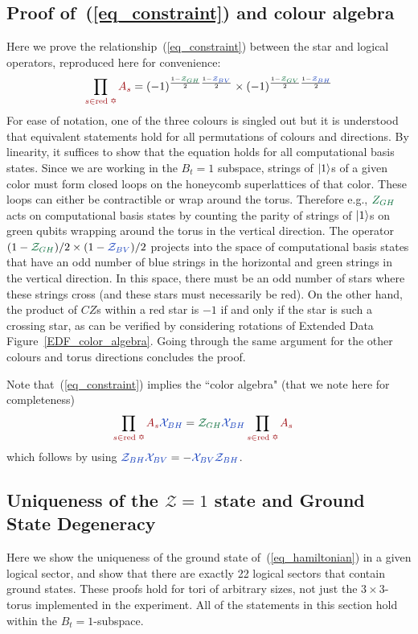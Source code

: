\documentclass[nofootinbib,pra,twocolumn,showpacs,superscriptaddress,notitlepage,amsmath]{revtex4-2} %
\begin{document}
\subsection{Proof of~(\ref{eq_constraint}) and colour algebra}
Here we prove the relationship~(\ref{eq_constraint}) between the star and logical operators, reproduced here for convenience:
\begin{equation}
    \prod_{\red{s \in \text{red \ding{65}}}} \red{A_s} = (-1)^{\frac{1-\green{\mathcal{Z}_{GH}}}{2}\frac{1-\blue{\mathcal{Z}_{BV}}}{2}} \times (-1)^{\frac{1-\green{\mathcal{Z}_{GV}}}{2}\frac{1-\blue{\mathcal{Z}_{BH}}}{2}}
\end{equation}
For ease of notation, one of the three colours is singled out but it is understood that equivalent statements hold for all permutations of colours and directions. By linearity, it suffices to show that the equation holds for all computational basis states. Since we are working in the $B_t = 1$ subspace, strings of $\ket{1}$s of a given color must form closed loops on the honeycomb superlattices of that color. These loops can either be contractible or wrap around the torus. Therefore e.g., $\green{Z_{GH}}$ acts on computational basis states by counting the parity of strings of $\ket{1}$s on green qubits wrapping around the torus in the vertical direction. The operator $(1-\green{\mathcal{Z}_{GH}})/2 \times (1-\blue{\mathcal{Z}_{BV}})/2$ projects into the space of computational basis states that have an odd number of blue strings in the horizontal and green strings in the vertical direction. In this space, there must be an odd number of stars where these strings cross (and these stars must necessarily be red). On the other hand, the product of $CZ$s within a red star is $-1$ if and only if the star is such a crossing star, as can be verified by considering rotations of Extended Data Figure~\ref{EDF_color_algebra}. Going through the same argument for the other colours and torus directions concludes the proof.

Note that~(\ref{eq_constraint}) implies the ``color algebra" (that we note here for completeness)
\begin{align}
    \prod_{\red{s \in \text{red \ding{65}}}} \red{A_s} \blue{\mathcal{X}_{BH}} &= \green{\mathcal{Z}_{GH}} \blue{\mathcal{X}_{BH}} \prod_{\red{s \in \text{red \ding{65}}}} \red{A_s}
\end{align}
which follows by using $\blue{\mathcal{Z}_{BH} \mathcal{X}_{BV}} = - \blue{\mathcal{X}_{BV} \mathcal{Z}_{BH}}$.

\subsection{Uniqueness of the $\mathcal{Z}=1$ state and Ground State Degeneracy}
\label{appendix_uniqueness_and_gs_degeneracy}
Here we show the uniqueness of the ground state of~(\ref{eq_hamiltonian}) in a given logical sector, and show that there are exactly 22 logical sectors that contain ground states. These proofs hold for tori of arbitrary sizes, not just the $3 \times 3$-torus implemented in the experiment. All of the statements in this section hold within the $B_t = 1$-subspace.
\end{document}
